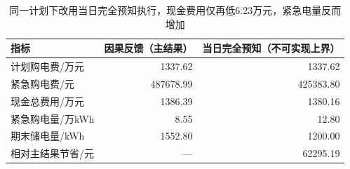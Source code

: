 \begin{table}[H]\centering\small
\caption{同一计划下改用当日完全预知执行，现金费用仅再低6.23万元，紧急电量反而增加}
\label{tab:review_oracle}
\begin{tabular}{lrr}\toprule
指标 & 因果反馈（主结果） & 当日完全预知（不可实现上界）\\\midrule
计划购电费/万元 & 1337.62 & 1337.62\\
紧急购电费/元 & 487678.99 & 425383.80\\
现金总费用/万元 & 1386.39 & 1380.16\\
紧急购电量/万kWh & 8.55 & 12.80\\
期末储电量/kWh & 1552.80 & 1200.00\\
相对主结果节省/元 & — & 62295.19\\
\bottomrule\end{tabular}\end{table}
